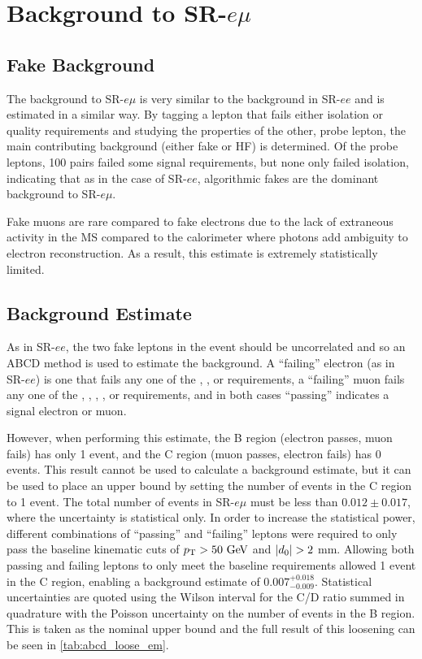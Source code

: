 \FloatBarrier
\section{Background to SR-$e\mu$}

\subsection{Fake Background}
The background to SR-$e\mu$ is very similar to the background in SR-$ee$ and is estimated in a similar way. By tagging a lepton that fails either isolation or quality requirements and studying the properties of the other, probe lepton, the main contributing background (either fake or \ac{HF}) is determined. Of the probe leptons, 100 pairs failed some signal requirements, but none only failed isolation, indicating that as in the case of SR-$ee$, algorithmic fakes are the dominant background to SR-$e\mu$. 

Fake muons are rare compared to fake electrons due to the lack of extraneous activity in the \ac{MS} compared to the calorimeter where photons add ambiguity to electron reconstruction. As a result, this estimate is extremely statistically limited.

\subsection{Background Estimate}
As in SR-$ee$, the two fake leptons in the event should be uncorrelated and so an ABCD method is used to estimate the background. A ``failing'' electron (as in SR-$ee$) is one that fails any one of the \dpt, \chiID, or \nmiss requirements, a ``failing'' muon fails any one of the  \chiID, \chiCB, \nmiss, \nprecision, or \nphi requirements, and in both cases ``passing'' indicates a signal electron or muon.

However, when performing this estimate, the B region (electron passes, muon fails) has only 1 event, and the C region (muon passes, electron fails) has 0 events. This result cannot be used to calculate a background estimate, but it can be used to place an upper bound by setting the number of events in the C region to 1 event. The total number of events in SR-$e\mu$ must be less than $0.012 \pm 0.017$, where the uncertainty is statistical only. In order to increase the statistical power, different combinations of ``passing'' and ``failing'' leptons were required to only pass the baseline kinematic cuts of $\pt > 50 \GeV$ and $|d_0| > 2$ mm. Allowing both passing and failing leptons to only meet the baseline requirements allowed 1 event in the C region, enabling a background estimate of $0.007^{+0.018}_{-0.009}$. Statistical uncertainties are quoted using the Wilson interval for the C/D ratio summed in quadrature with the Poisson uncertainty on the number of events in the B region. This is taken as the nominal upper bound and the full result of this loosening can be seen in \autoref{tab:abcd_loose_em}.

